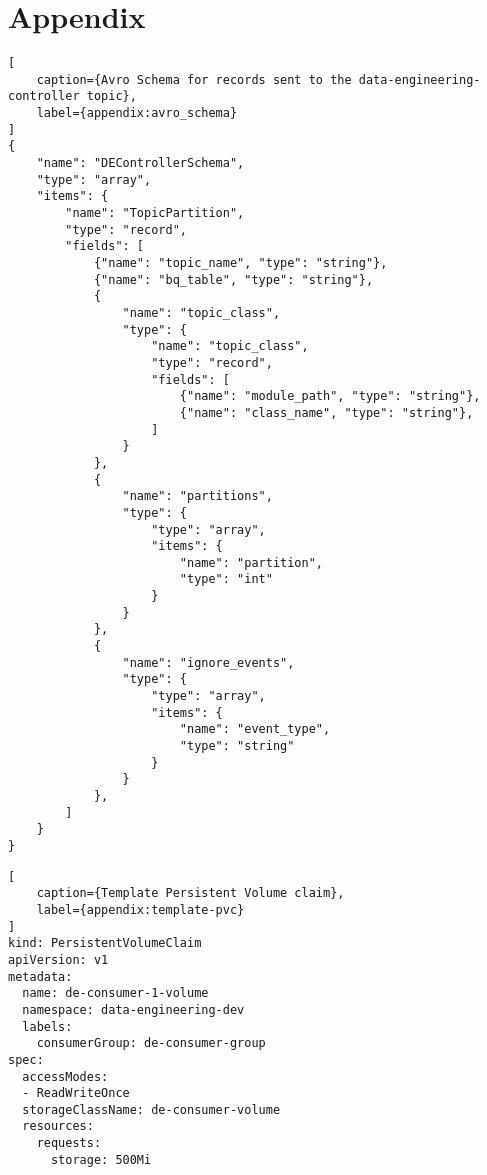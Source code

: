 \chapter{Appendix} \label{ap1:Lorem}

\begin{lstlisting}[
    caption={Avro Schema for records sent to the data-engineering-controller topic}, 
    label={appendix:avro_schema}
]
{
    "name": "DEControllerSchema",
    "type": "array",
    "items": {
        "name": "TopicPartition",
        "type": "record",
        "fields": [
            {"name": "topic_name", "type": "string"},
            {"name": "bq_table", "type": "string"},
            {
                "name": "topic_class", 
                "type": {
                    "name": "topic_class",
                    "type": "record",
                    "fields": [
                        {"name": "module_path", "type": "string"},
                        {"name": "class_name", "type": "string"},
                    ]
                }
            },
            {
                "name": "partitions", 
                "type": {
                    "type": "array", 
                    "items": {
                        "name": "partition",
                        "type": "int"
                    }
                }
            },
            {
                "name": "ignore_events", 
                "type": {
                    "type": "array", 
                    "items": {
                        "name": "event_type",
                        "type": "string"
                    }
                }
            },
        ]
    }
}
\end{lstlisting}

\begin{lstlisting}[
    caption={Template Persistent Volume claim}, 
    label={appendix:template-pvc}
]
kind: PersistentVolumeClaim
apiVersion: v1
metadata:
  name: de-consumer-1-volume
  namespace: data-engineering-dev
  labels:
    consumerGroup: de-consumer-group
spec:
  accessModes:
  - ReadWriteOnce
  storageClassName: de-consumer-volume
  resources:
    requests:
      storage: 500Mi
\end{lstlisting}

